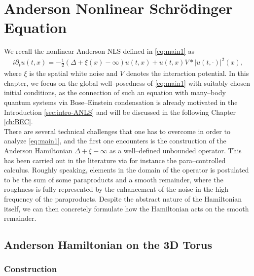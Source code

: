 \chapter{Anderson Nonlinear Schrödinger Equation}\label{ch:ANLS}

We recall the nonlinear Anderson NLS defined in \eqref{eq:main1} as 
\begin{align*}
  i \partial_t u (t, x) = - \frac{1}{2} (\Delta + \xi (x) - \infty) u (t, x) +
  u (t, x) V \ast | u (t, \cdot) |^2 (x),
\end{align*}
where $\xi$ is the spatial white noise and $V$ denotes the interaction potential. In this chapter, we focus on the global well--posedness of \eqref{eq:main1} with suitably chosen initial conditions, as the connection of such an equation with many--body quantum systems via Bose--Einstein condensation is already motivated in the Introduction \ref{sec:intro-ANLS} and will be discussed in the following Chapter \ref{ch:BEC}.\\

There are several technical challenges that one has to overcome in order to analyze \eqref{eq:main1}, and the first one encounters is the construction of the Anderson Hamiltonian $\Delta + \xi - \infty$ as a well--defined unbounded operator. This has been carried out in the literature via for instance the para--controlled calculus. Roughly speaking, elements in the domain of the operator is postulated to be the sum of some paraproducts and a smooth remainder, where the roughness is fully represented by the enhancement of the noise in the high--frequency of the paraproducts. Despite the abstract nature of the Hamiltonian itself, we can then concretely formulate how the Hamiltonian acts on the smooth remainder.

\section{Anderson Hamiltonian on the 3D Torus}\label{sec:AH}

\subsection{Construction}\label{sec:construction-AH}

